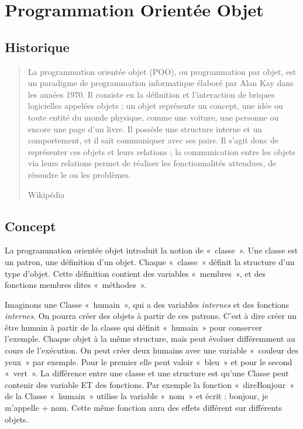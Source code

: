 \section{Programmation Orientée Objet}
  \label{DefPOO}
  \subsection{Historique}
  	\begin{quotation}
  		La programmation orientée objet (POO), ou programmation par objet, est un paradigme de programmation informatique élaboré par Alan Kay dans les années 1970. Il consiste en la définition et l'interaction de briques logicielles appelées objets ; un objet représente un concept, une idée ou toute entité du monde physique, comme une voiture, une personne ou encore une page d'un livre. Il possède une structure interne et un comportement, et il sait communiquer avec ses pairs. Il s'agit donc de représenter ces objets et leurs relations ; la communication entre les objets via leurs relations permet de réaliser les fonctionnalités attendues, de résoudre le ou les problèmes.
  		\begin{flushright}
  			Wikipédia
  		\end{flushright}
  	\end{quotation}
  \subsection{Concept}
    La programmation orientée objet introduit la notion de «~classe~». Une classe est 
    un patron, une définition d'un objet. Chaque «~classe~» définit la structure d'un type
    d'objet. Cette définition contient des variables «~membres~», et des fonctions membres dites «~méthodes~».
    
    Imaginons une Classe «~humain~», qui a des variables \textit{internes} et
    des fonctions \textit{internes}. On pourra créer des objets à partir de ces patrons. C'est à dire 
    créer un être humain à partir de la classe qui définit «~humain~» pour conserver l'exemple. Chaque objet 
    à la même structure, mais peut évoluer différemment au cours de l’exécution. On peut créer
    deux humains avec une variable «~couleur des yeux~» par exemple. Pour le premier elle peut valoir «~bleu~» et pour le second «~vert~». La différence entre une classe et une structure est qu'une Classe 
    peut contenir des variable ET des fonctions. Par exemple la fonction «~direBonjour~» de la 
    Classe «~humain~» utilise la variable «~nom~» et écrit : bonjour, je m'appelle + nom.
    Cette même fonction aura des effets différent sur différents objets.
    
